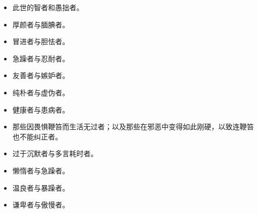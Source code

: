 \begin{itemize}
\item 此世的智者和愚拙者。
\end{itemize}

\begin{itemize}
\item 厚颜者与腼腆者。
\end{itemize}

\begin{itemize}
\item 冒进者与胆怯者。
\end{itemize}

\begin{itemize}
\item 急躁者与忍耐者。
\end{itemize}

\begin{itemize}
\item 友善者与嫉妒者。
\end{itemize}

\begin{itemize}
\item 纯朴者与虚伪者。
\end{itemize}

\begin{itemize}
\item 健康者与患病者。
\end{itemize}

\begin{itemize}
\item 那些因畏惧鞭笞而生活无过者；以及那些在邪恶中变得如此刚硬，以致连鞭笞也不能纠正者。
\end{itemize}

\begin{itemize}
\item 过于沉默者与多言耗时者。
\end{itemize}

\begin{itemize}
\item 懒惰者与急躁者。
\end{itemize}

\begin{itemize}
\item 温良者与暴躁者。
\end{itemize}

\begin{itemize}
\item 谦卑者与傲慢者。
\end{itemize}

